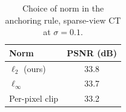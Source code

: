 \begin{table}[t]
  \centering
  \caption{Choice of norm in the anchoring rule, sparse-view CT at $\sigma = 0.1$.}
  \label{tab:norm}
  \begin{tabular}{lc}
    \toprule
    Norm & PSNR (dB) \\
    \midrule
    $\ell_2$ (ours) & 33.8 \\
    $\ell_\infty$ & 33.7 \\
    Per-pixel clip & 33.2 \\
    \bottomrule
  \end{tabular}
\end{table}
